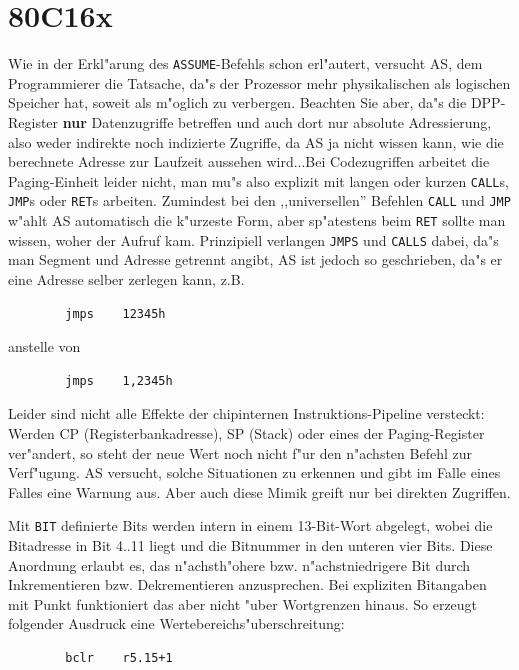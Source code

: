 \documentclass[12pt,a4paper,twoside]{report}
\newcommand{\bb}[1]{{\bf #1}}
\newcommand{\tty}[1]{{\tt #1}}
\newcommand{\asname}{AS}
\begin{document}

\section{80C16x}

Wie in der Erkl"arung des \tty{ASSUME}-Befehls schon erl"autert, versucht
\asname{}, dem Programmierer die Tatsache, da"s der Prozessor mehr physikalischen
als logischen Speicher hat, soweit als m"oglich zu verbergen.  Beachten
Sie aber, da"s die DPP-Register \bb{nur} Datenzugriffe betreffen und auch dort
nur absolute Adressierung, also weder indirekte noch indizierte Zugriffe,
da \asname{} ja nicht wissen kann, wie die berechnete Adresse zur Laufzeit
aussehen wird...Bei Codezugriffen arbeitet die Paging-Einheit leider nicht,
man mu"s also explizit mit langen oder kurzen \tty{CALL}s, \tty{JMP}s oder
\tty{RET}s arbeiten.  Zumindest bei den ,,universellen'' Befehlen \tty{CALL}
und \tty{JMP} w"ahlt \asname{} automatisch die k"urzeste Form, aber sp"atestens
beim \tty{RET} sollte man wissen, woher der Aufruf kam.  Prinzipiell
verlangen \tty{JMPS} und \tty{CALLS} dabei, da"s man Segment und Adresse
getrennt angibt, \asname{} ist jedoch so geschrieben, da"s er eine Adresse selber
zerlegen kann, z.B.
\begin{verbatim}
        jmps    12345h
\end{verbatim}
anstelle von
\begin{verbatim}
        jmps    1,2345h
\end{verbatim}
Leider sind nicht alle Effekte der chipinternen Instruktions-Pipeline
versteckt: Werden CP (Registerbankadresse), SP (Stack) oder eines der
Paging-Register ver"andert, so steht der neue Wert noch nicht f"ur den
n"achsten Befehl zur Verf"ugung.  \asname{} versucht, solche Situationen zu
erkennen und gibt im Falle eines Falles eine Warnung aus.  Aber auch
diese Mimik greift nur bei direkten Zugriffen.
\par
Mit \tty{BIT} definierte Bits werden intern in einem 13-Bit-Wort abgelegt,
wobei die Bitadresse in Bit 4..11 liegt und die Bitnummer in den unteren
vier Bits.  Diese Anordnung erlaubt es, das n"achsth"ohere bzw.
n"achstniedrigere Bit durch Inkrementieren bzw. Dekrementieren anzusprechen.
Bei expliziten Bitangaben mit Punkt funktioniert das aber nicht "uber
Wortgrenzen hinaus.  So erzeugt folgender Ausdruck eine
Wertebereichs"uberschreitung:
\begin{verbatim}
        bclr    r5.15+1
\end{verbatim}
\end{document}
